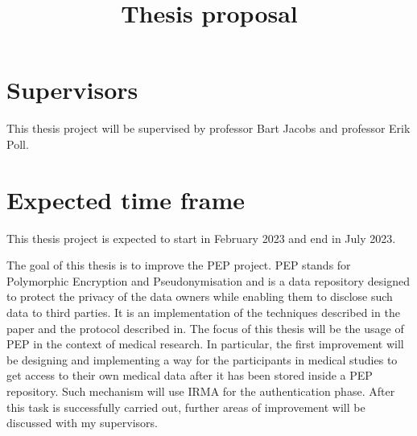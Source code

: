 \documentclass[a4paper]{article}
\begin{document}
\title{Thesis proposal}
\date{}
\maketitle
\section{Supervisors}
This thesis project will be supervised by professor Bart Jacobs and professor Erik Poll.

\section{Expected time frame}
This thesis project is expected to start in February 2023 and end in July 2023.

The goal of this thesis is to improve the PEP project\cite{pepproject}. PEP stands for Polymorphic Encryption and Pseudonymisation and is a data repository designed to protect the privacy of the data owners while enabling them to disclose such data to third parties. It is an implementation of the techniques described in the paper\cite{peppaper} and the protocol described in\cite{cryptoeprint}. The focus of this thesis will be the usage of PEP in the context of medical research. In particular, the first improvement will be designing and implementing a way for the participants in medical studies to get access to their own medical data after it has been stored inside a PEP repository. Such mechanism will use IRMA\cite{irma-app}\cite{about-irma} for the authentication phase. After this task is successfully carried out, further areas of improvement will be discussed with my supervisors.  

\printbibliography
\end{document}
